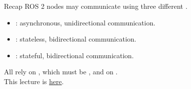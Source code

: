 
\begin{frame}{Recap}
  \justifying
  ROS 2 nodes may communicate using three different .
  \begin{itemize}
    \item {}: asynchronous, unidirectional communication.
    \item {}: stateless, bidirectional communication.
    \item {}: stateful, bidirectional communication.
  \end{itemize}
  \smallskip
  All rely on , which must be , and on .\\
  \bigskip
  This lecture is \href{https://github.com/robmasocco/DAFN26_Robotics_8}{\color{blue}\underline{here}}.
\end{frame}
